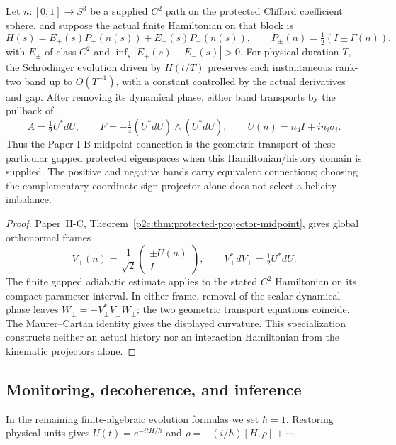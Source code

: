 \documentclass[12pt,a4paper]{article}
\begin{document}
\begin{corollary}
\label{p4:cor:clifford-midpoint-adiabatic}
Let \(n:[0,1]\to S^3\) be a supplied \(C^2\) path on the protected
Clifford coefficient sphere, and suppose the actual finite Hamiltonian on
that block is
\[
 H(s)=E_+(s)P_+(n(s))+E_-(s)P_-(n(s)),\qquad
 P_\pm(n)=\tfrac12(I\pm\Gamma(n)),
\]
with \(E_\pm\) of class \(C^2\) and
\(\inf_s|E_+(s)-E_-(s)|>0\).  For physical duration \(T\), the
Schr\"odinger evolution driven by \(H(t/T)\) preserves each instantaneous
rank-two band up to \(O(T^{-1})\), with a constant controlled by the
actual derivatives and gap.  After removing its dynamical phase, either
band transports by the pullback of
\[
 \boxed{A=\tfrac12U^*dU,\qquad
 F=-\tfrac14(U^*dU)\wedge(U^*dU),\qquad
 U(n)=n_4I+i n_i\sigma_i.}
\]
Thus the Paper-I-B midpoint connection is the geometric transport of these
particular gapped protected eigenspaces when this Hamiltonian/history
domain is supplied.  The positive and negative bands carry equivalent
connections; choosing the complementary coordinate-sign projector alone
does not select a helicity imbalance.
\end{corollary}

\begin{proof}
Paper~II-C, Theorem~\ref{p2c:thm:protected-projector-midpoint}, gives
global orthonormal frames
\[
 V_\pm(n)=\frac1{\sqrt2}
 \begin{pmatrix}\pm U(n)\\I\end{pmatrix},\qquad
 V_\pm^*dV_\pm=\tfrac12U^*dU.
\]
The finite gapped adiabatic estimate applies to the stated \(C^2\)
Hamiltonian on its compact parameter interval.  In either frame, removal
of the scalar dynamical phase leaves
\(\dot W_\pm=-V_\pm^*\dot V_\pm W_\pm\); the two geometric
transport equations coincide.  The Maurer--Cartan identity gives the
displayed curvature.  This specialization constructs neither an actual
history nor an interaction Hamiltonian from the kinematic projectors alone.
\end{proof}




\subsection[Continuous monitoring, decoherence, and controlled inference]
{Monitoring, decoherence, and inference}
\label{p4:sec:part3-monitoring}

In the remaining finite-algebraic evolution formulas we set $\hbar=1$. Restoring physical units gives $U(t)=e^{-itH/\hbar}$ and $\dot\rho=-(i/\hbar)[H,\rho]+\cdots$.
\end{document}

